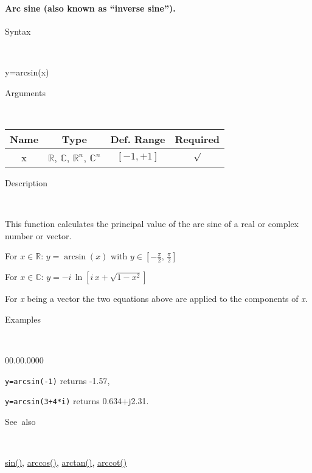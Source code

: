 \paragraph{\label{par:Arc-sine}Arc sine (also known as {}``inverse sine'').}

\begin{description}
\item [Syntax]~
\end{description}
y=arcsin(x)

\begin{description}
\item [Arguments]~
\end{description}
\begin{tabular}{|c|c|c|c|}
\hline 
Name&
Type&
Def. Range&
Required\tabularnewline
\hline
\hline 
x&
$\mathbb{R}$, $\mathbb{C}$, $\mathbb{R}^{n}$, $\mathbb{C}^{n}$&
$\left[-1,+1\right]$&
$\surd$\tabularnewline
\hline
\end{tabular}

\begin{description}
\item [Description]~
\end{description}
This function calculates the principal value of the arc sine of a
real or complex number or vector.

\medskip{}
For $x\in\mathbb{R}$: $y=\arcsin\left(x\right)$ with $y\in\left[-\frac{\pi}{2},\,\frac{\pi}{2}\right]$

\medskip{}
For $x\in\mathbb{C}$: $y=-i\,\ln\left[i\, x+\sqrt{1-x^{2}}\right]$
\medskip{}

\noindent For \textit{x} being a vector the two equations above are
applied to the components of \textit{x}.

\begin{description}
\item [Examples]~
\end{description}
\begin{lyxlist}{00.00.0000}
\item [\texttt{y=arcsin(-1)}]returns -1.57,
\item [\texttt{y=arcsin(3+4{*}i)}]returns 0.634+j2.31.
\end{lyxlist}
\begin{description}
\item [See~also]~
\end{description}
\textcolor{blue}{\hyperlink{sin}{sin()}}\textcolor{black}{,} \textcolor{blue}{\hyperlink{arccos}{arccos()}}\textcolor{black}{,}
\textcolor{blue}{\hyperlink{arctan}{arctan()}}\textcolor{black}{,}
\textcolor{blue}{\hyperlink{arccot}{arccot()}}



